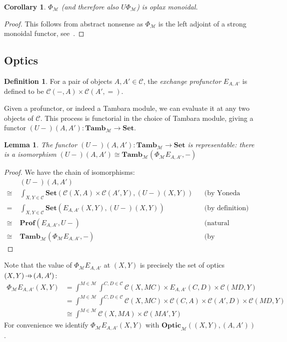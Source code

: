 \documentclass[11pt,letterpaper]{article}
\theoremstyle{plain}
\newtheorem{lemma}[theorem]{Lemma}
\newtheorem{corollary}[theorem]{Corollary}
\theoremstyle{definition}
\newtheorem{definition}[theorem]{Definition}
\newcommand{\C}{\mathscr{C}}
\newcommand{\M}{\mathscr{M}}
\newcommand{\Pastro}{\Phi}
\newcommand{\Set}{\mathbf{Set}}
\newcommand{\Prof}{\mathbf{Prof}}
\newcommand{\Tamb}{\mathbf{Tamb}}
\newcommand{\Optic}{\mathbf{Optic}}
\newcommand{\hto}{\ensuremath{\,\mathaccent\shortmid\rightarrow\,}}
\begin{document}
\begin{corollary}
  $\Pastro_\M$ (and therefore also $U \Pastro_\M$) is oplax monoidal.
\end{corollary}
\begin{proof}
  This follows from abstract nonsense as $\Pastro_\M$ is the left adjoint of a strong monoidal functor, see~\cite{Kelly1974}.
\end{proof}

\subsection{Optics}
\begin{definition}
  For a pair of objects $A, A' \in \C$, the \emph{exchange profunctor} $E_{A, A'}$ is defined to be $\C(-, A) \times \C(A', {=})$.
\end{definition}

Given a profunctor, or indeed a Tambara module, we can evaluate it at any two objects of $\C$. This process is functorial in the choice of Tambara module, giving a functor $(U-)(A,A') : \Tamb_\M \to \Set$.

\begin{lemma}\label{lemma-rep}
  The functor $(U-)(A,A') : \Tamb_\M \to \Set$ is representable: there is a isomorphism $(U-)(A,A') \cong \Tamb_\M(\Pastro_\M E_{A, A'}, -)$
\end{lemma}
\begin{proof}
  We have the chain of isomorphisms:
  \begin{align*}
    &(U-)(A,A') \\
    \cong \;&\int_{X,Y \in \C} \Set(\C(X,A) \times \C(A',Y), (U-)(X,Y)) && \text{(by Yoneda reduction twice)} \\
    =\;&\int_{X,Y \in \C} \Set(E_{A, A'}(X,Y), (U-)(X,Y)) && \text{(by definition)}\\
    \cong \;&\Prof(E_{A, A'}, U-) && \text{(natural transformations as ends)} \\
    \cong \;&\Tamb_\M(\Pastro_\M E_{A, A'}, -) && \text{(by adjointness)}
  \end{align*}
\end{proof}

Note that the value of $\Pastro_\M E_{A, A'}$ at $(X,Y)$ is precisely the set of optics $(X, Y) \hto (A, A')$:
\begin{align*}
\Pastro_\M E_{A, A'} (X, Y)
&= \int^{M \in \M} \int^{C,D \in \C} \C(X, MC) \times E_{A, A'}(C,D) \times  \C(MD, Y) \\
&= \int^{M \in \M} \int^{C,D \in \C} \C(X, MC) \times \C(C, A) \times \C(A', D) \times \C(MD, Y) \\
&\cong \int^{M \in \M} \C(X, MA) \times \C(MA', Y)
\end{align*}
For convenience we identify $\Pastro_\M E_{A, A'}(X,Y)$ with $\Optic_\M((X, Y), (A, A'))$.
\end{document}
